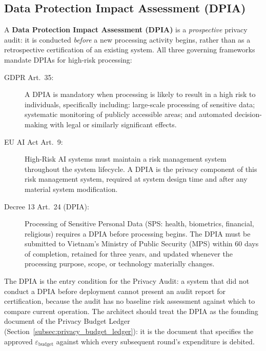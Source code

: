 \subsection{Data Protection Impact Assessment (DPIA)}
\label{subsec:dpia}

A \textbf{Data Protection Impact Assessment (DPIA)} is a \emph{prospective} privacy audit: it is conducted \emph{before} a new processing activity begins, rather than as a retrospective certification of an existing system. All three governing frameworks mandate DPIAs for high-risk processing:

\begin{description}
  \item[GDPR Art.~35:] A DPIA is mandatory when processing is likely to result in a high risk to individuals, specifically including: large-scale processing of sensitive data; systematic monitoring of publicly accessible areas; and automated decision-making with legal or similarly significant effects.
  \item[EU AI Act Art.~9:] High-Risk AI systems must maintain a risk management system throughout the system lifecycle. A DPIA is the privacy component of this risk management system, required at system design time and after any material system modification.
  \item[Decree 13 Art.~24 (DPIA):] Processing of Sensitive Personal Data (SPS: health, biometrics, financial, religious) requires a DPIA before processing begins. The DPIA must be submitted to Vietnam's Ministry of Public Security (MPS) within 60 days of completion, retained for three years, and updated whenever the processing purpose, scope, or technology materially changes.
\end{description}

The DPIA is the entry condition for the Privacy Audit: a system that did not conduct a DPIA before deployment cannot present an audit report for certification, because the audit has no baseline risk assessment against which to compare current operation. The architect should treat the DPIA as the founding document of the Privacy Budget Ledger (Section~\ref{subsec:privacy_budget_ledger}): it is the document that specifies the approved $\varepsilon_{\text{budget}}$ against which every subsequent round's expenditure is debited.

